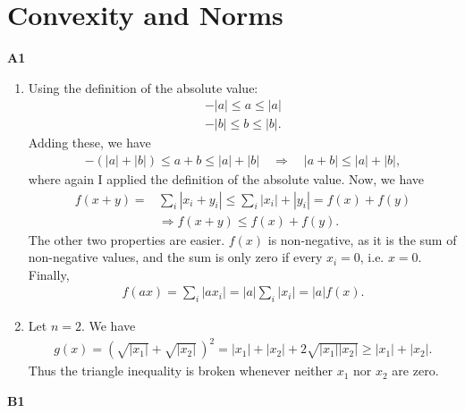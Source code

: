 \documentclass{article}
\begin{document}
\section*{Convexity and Norms}

\textbf{A1}
\begin{enumerate}
        \item 
        Using the definition of the absolute value:
        \begin{align*}
                -|a| \leq a \leq |a| \\
                -|b| \leq b \leq |b|.
        \end{align*}
        Adding these, we have
        \begin{align*}
                -(|a| + |b|) \leq a + b \leq |a| + |b| \quad \Rightarrow \quad |a + b| \leq |a| + |b|,
        \end{align*}
        where again I applied the definition of the absolute value.
        Now, we have
        \begin{align*}
                f(x+y) =& \sum_i |x_i + y_i| \leq \sum_i |x_i| + |y_i| = f(x) + f(y) \\
                &\Rightarrow f(x+y) \leq f(x) + f(y).
        \end{align*}
        The other two properties are easier. 
        $f(x)$ is non-negative, as it is the sum of non-negative values, and the sum is only zero if every $x_i = 0$, i.e. $x = 0$.
        Finally,
        \begin{align*}
                f(ax) = \sum_i |a x_i| = |a| \sum_i |x_i| = |a| f(x).
        \end{align*}

        \item
        Let $n = 2$.
        We have
        \begin{align*}
                g(x) = \left( \sqrt{|x_1|} + \sqrt{|x_2|} \, \right)^2 = |x_1| + |x_2| + 2 \sqrt{|x_1||x_2|} \geq |x_1| + |x_2|.
        \end{align*}
        Thus the triangle inequality is broken whenever neither $x_1$ nor $x_2$ are zero.
\end{enumerate}

\textbf{B1}
\end{document}
